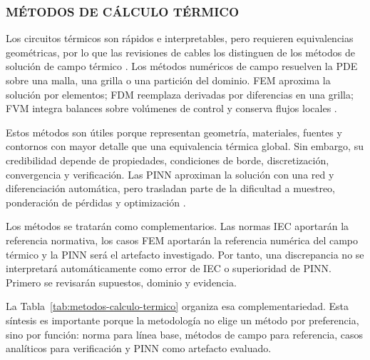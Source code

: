 \documentclass[11pt,a4paper,oneside]{report}
\begin{document}
\subsubsection{MÉTODOS DE CÁLCULO TÉRMICO}
\label{subsec:metodos-calculo-termico}

Los circuitos térmicos son rápidos e interpretables, pero requieren equivalencias geométricas, por lo que las revisiones de cables los distinguen de los métodos de solución de campo térmico \parencite[4--6]{enescu2021}. Los métodos numéricos de campo resuelven la PDE sobre una malla, una grilla o una partición del dominio. FEM aproxima la solución por elementos; FDM reemplaza derivadas por diferencias en una grilla; FVM integra balances sobre volúmenes de control y conserva flujos locales \parencites{patankar1980numerical}[3--4,93--99]{cigre2025}.

Estos métodos son útiles porque representan geometría, materiales, fuentes y contornos con mayor detalle que una equivalencia térmica global. Sin embargo, su credibilidad depende de propiedades, condiciones de borde, discretización, convergencia y verificación. Las PINN aproximan la solución con una red y diferenciación automática, pero trasladan parte de la dificultad a muestreo, ponderación de pérdidas y optimización \parencites[3--4,93--99]{cigre2025}[1--2,14--17]{lawal2022}.

Los métodos se tratarán como complementarios. Las normas IEC aportarán la referencia normativa, los casos FEM aportarán la referencia numérica del campo térmico y la PINN será el artefacto investigado. Por tanto, una discrepancia no se interpretará automáticamente como error de IEC o superioridad de PINN. Primero se revisarán supuestos, dominio y evidencia.

La Tabla~\ref{tab:metodos-calculo-termico} organiza esa complementariedad. Esta síntesis es importante porque la metodología no elige un método por preferencia, sino por función: norma para línea base, métodos de campo para referencia, casos analíticos para verificación y PINN como artefacto evaluado.
\end{document}
